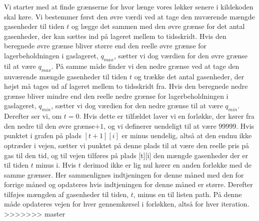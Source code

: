 Vi starter med at finde grænserne for hvor længe vores løkker senere i kildekoden skal køre. Vi bestemmer først den øvre værdi ved at tage den nuværende mængde gasenheder til tiden $t$ og lægge det sammen med den øvre grænse for det antal gasenheder, der kan sættes ind på lageret mellem to tidsskridt. Hvis den beregnede øvre grænse bliver større end den reelle øvre grænse for lagerbeholdningen i gaslageret, $q_{max}$, sætter vi dog værdien for den øvre grænse til at være $q_{max}$. På samme måde finder vi den nedre grænse ved at tage den nuværende mængde gasenheder til tiden $t$ og trække det antal gasenheder, der højst må tages ud af lageret mellem to tidsskridt fra. Hvis den beregnede nedre grænse bliver mindre end den reelle nedre grænse for lagerbeholdningen i gaslageret, $q_{min}$, sætter vi dog værdien for den nedre grænse til at være $q_{min}$. Derefter ser vi, om $t=0$. Hvis dette er tilfældet laver vi en forløkke, der kører fra den nedre til den øvre grænse$+1$, og vi definerer uendeligt til at være 99999. Hvis punktet i grafen på plads $[t+1][i]$ er minus uendelig, altså at den endnu ikke optræder i vejen, sætter vi punktet på denne plads til at være den reelle pris på gas til den tid, og til vejen tilføres på plads [t][i] den mængde gasenheder der er til tiden $t$ minus i. Hvis $t$ derimod ikke er lig nul kører en anden forløkke med de samme grænser. Her sammenlignes indtjeningen for denne måned med den for forrige måned og opdateres hvis indtjeningen for denne måned er større. Derefter tilføjes mængden af gasenheder til tiden, $t$, minus en til listen path. På denne måde opdateres vejen for hver gennemkørsel i forløkken, altså for hver iteration.
>>>>>>> master
